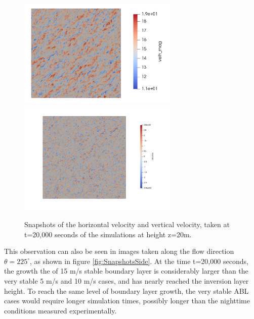 \begin{figure}[hbt!]
  \includegraphics[width=3.0in]{figures/snapshots/15ms/velh_mag_z20.png}
  \includegraphics[width=3.0in]{figures/snapshots/15ms/velz_z20_samelimits.png} \\
  \caption{ \label{fig:SnapshotsZ20} Snapshots of the horizontal
    velocity and vertical velocity, taken at t=20,000 seconds of the
    simulations at height z=20m.}
\end{figure}

This observation can also be seen in images taken along the flow
direction $\theta=225^\circ$, as shown in figure
\ref{fig:SnapshotsSide}.  At the time t=20,000 seconds, the growth the
of 15 m/s stable boundary layer is considerably larger than the very
stable 5 m/s and 10 m/s cases, and has nearly reached the inversion
layer height.  To reach the same level of boundary layer growth, the
very stable ABL cases would require longer simulation times, possibly
longer than the nighttime conditions measured experimentally.

